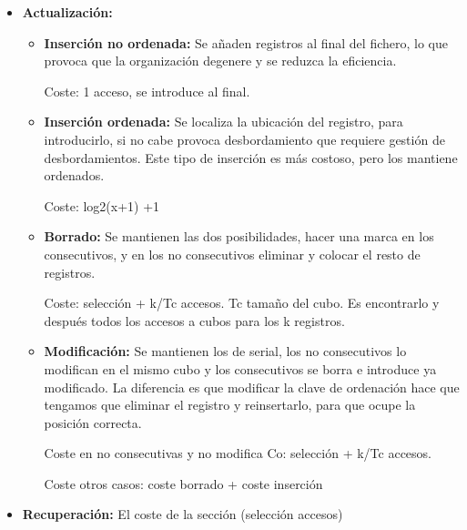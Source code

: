 \documentclass[12pt, twoside, openright]{report} %
\begin{document}
\begin{itemize}
\begin{itemize}
      \begin{itemize}
      \item \textbf{Actualización:}
        

        \begin{itemize}
        \item \textbf{Inserción no ordenada:} Se añaden registros al final
          del fichero, lo que provoca que la organización degenere y se
          reduzca la eficiencia.
          

        
		  
            Coste: 1 acceso, se introduce al final.
           
			
        \item \textbf{Inserción ordenada:} Se localiza la ubicación del
          registro, para introducirlo, si no cabe provoca desbordamiento
          que requiere gestión de desbordamientos. Este tipo de
          inserción es más costoso, pero los mantiene ordenados.
          

         
		  
            Coste: log2(x+1) +1
            
			
        \item \textbf{Borrado:} Se mantienen las dos posibilidades, hacer
          una marca en los consecutivos, y en los no consecutivos
          eliminar y colocar el resto de registros.
          

         
		  
            Coste: selección + k/Tc accesos. Tc tamaño del cubo. Es
            encontrarlo y después todos los accesos a cubos para los k
            registros.
         
			
        \item \textbf{Modificación:} Se mantienen los de serial, los no
          consecutivos lo modifican en el mismo cubo y los consecutivos
          se borra e introduce ya modificado. La diferencia es que
          modificar la clave de ordenación hace que tengamos que
          eliminar el registro y reinsertarlo, para que ocupe la
          posición correcta.
          

         
		  
            Coste en no consecutivas y no modifica Co: selección + k/Tc
            accesos.
           
			
            Coste otros casos: coste borrado + coste inserción
           
			
        \end{itemize}
      \item \textbf{Recuperación:} El coste de la sección (selección
        accesos)
        

\end{itemize}
\end{itemize}
\end{itemize}
\end{document}
